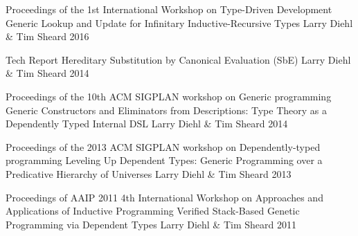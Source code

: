 

\begin{cventries}

  \cventry
    {Proceedings of the 1st International Workshop on Type-Driven Development} %
    {Generic Lookup and Update for Infinitary Inductive-Recursive Types} %
    {Larry Diehl \& Tim Sheard} %
    {2016} %
    {}

  \cventry
    {Tech Report} %
    {Hereditary Substitution by Canonical Evaluation (SbE)} %
    {Larry Diehl \& Tim Sheard} %
    {2014} %
    {}

  \cventry
    {Proceedings of the 10th ACM SIGPLAN workshop on Generic programming} %
    {Generic Constructors and Eliminators from Descriptions: Type Theory as a Dependently Typed Internal DSL} %
    {Larry Diehl \& Tim Sheard} %
    {2014} %
    {}


  \cventry
    {Proceedings of the 2013 ACM SIGPLAN workshop on Dependently-typed programming} %
    {Leveling Up Dependent Types: Generic Programming over a Predicative Hierarchy of Universes} %
    {Larry Diehl \& Tim Sheard} %
    {2013} %
    {}

  \cventry
    {Proceedings of AAIP 2011 4th International Workshop on Approaches and Applications of Inductive Programming} %
    {Verified Stack-Based Genetic Programming via Dependent Types} %
    {Larry Diehl \& Tim Sheard} %
    {2011} %
    {}

\end{cventries}

